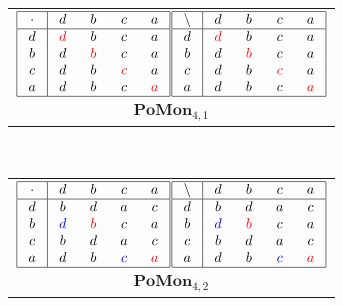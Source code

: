 \documentclass{amsart}
\newcommand{\g}{\textcolor{blue}}
\newcommand{\rd}{\textcolor{red}}
\newcommand{\W}[1]{\makebox[12pt]{$#1$}}%
\begin{document}
\ 
\begin{tabular}[b]{c}
$\begin{array}{|c|cccc|}\hline
\W{\cdot}&\W{d}&\W{b}&\W{c}&\W{a}\\\hline
d&\rd{d}&b&c&a\\
b&d&\rd{b}&c&a\\
c&d&b&\rd{c}&a\\
a&d&b&c&\rd{a}\\
\hline
\end{array}$$\begin{array}{|c|cccc|}\hline
\W{\backslash}&\W{d}&\W{b}&\W{c}&\W{a}\\\hline
d&\rd{d}&b&c&a\\
b&d&\rd{b}&c&a\\
c&d&b&\rd{c}&a\\
a&d&b&c&\rd{a}\\
\hline
\end{array}$\\
$\mathbf{PoMon}_{4,1}$
\end{tabular}
\ 
\begin{tabular}[b]{c}
$\begin{array}{|c|cccc|}\hline
\W{\cdot}&\W{d}&\W{b}&\W{c}&\W{a}\\\hline
d&b&d&a&c\\
b&\g{d}&\rd{b}&c&a\\
c&b&d&a&c\\
a&d&b&\g{c}&\rd{a}\\
\hline
\end{array}$$\begin{array}{|c|cccc|}\hline
\W{\backslash}&\W{d}&\W{b}&\W{c}&\W{a}\\\hline
d&b&d&a&c\\
b&\g{d}&\rd{b}&c&a\\
c&b&d&a&c\\
a&d&b&\g{c}&\rd{a}\\
\hline
\end{array}$\\
$\mathbf{PoMon}_{4,2}$
\end{tabular}
\ 
\end{document}
